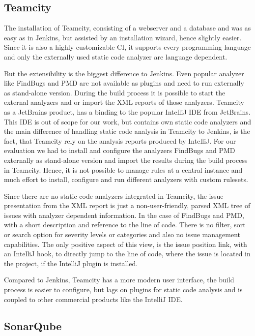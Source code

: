 \documentclass[conference]{IEEEtran}
\begin{document}
\subsection{Teamcity}
\label{subsec:evaluation_teamcity}


The installation of Teamcity, consisting of a webserver and a database and was as easy as in Jenkins, but assisted by an installation wizard, hence slightly easier. 
Since it is also a highly customizable CI, it supports every programming language and only the externally used static code analyzer are language dependent.


But the extensibility is the biggest difference to Jenkins.
Even popular analyzer like FindBugs and PMD are not available as plugins and need to run externally as stand-alone version.
During the build process it is possible to start the external analyzers and or import the XML reports of those analyzers.
Teamcity as a JetBrains product, has a binding to the popular IntelliJ IDE from JetBrains.
This IDE is out of scope for our work, but contains own static code analyzers and the main difference of handling static code analysis in Teamcity to Jenkins, is the fact, that Teamcity rely on the analysis reports produced by IntelliJ. 
For our evaluation we had to install and configure the analyzers FindBugs and PMD externally as stand-alone version and import the results during the build process in Teamcity.
Hence, it is not possible to manage rules at a central instance and much effort to install, configure and run different analyzers with custom rulesets.


Since there are no static code analyzers integrated in Teamcity, the issue presentation from the XML report is just a non-user-friendly, parsed XML tree of issues with analyzer dependent information. In the case of FindBugs and PMD, with a short description and reference to the line of code.
There is no filter, sort or search option for severity levels or categories and also no issue management capabilities.
The only positive aspect of this view, is the issue position link, with an IntelliJ hook, to directly jump to the line of code, where the issue is located in the project, if the IntelliJ plugin is installed.


Compared to Jenkins, Teamcity has a more modern user interface, the build process is easier to configure, but lags on plugins for static code analysis and is coupled to other commercial products like the IntelliJ IDE.


\subsection{SonarQube}
\label{subsec:evaluation_sonarqube}
\end{document}
